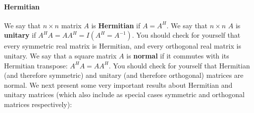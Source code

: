 \documentclass[12pt,oneside]{article}
\begin{document}
\paragraph{Hermitian}
We say that $n \times n$ matrix $A$ is \textbf{Hermitian} if $A = A^H$. We say that $n \times n$ $A$ is \textbf{unitary} if $A^H A = A A^H = I (A^H = A^{-1})$. You should check for yourself that every symmetric real matrix is  Hermitian, and every orthogonal real matrix is unitary. We say that a square matrix $A$ is \textbf{normal} if it commutes with its Hermitian transpose: $A^H A = A A^H$. You should check for yourself that Hermitian (and therefore symmetric) and unitary (and therefore orthogonal) matrices are normal.  We next present some very important results about Hermitian and unitary matrices (which also include as special cases symmetric and orthogonal matrices respectively):
\end{document}
